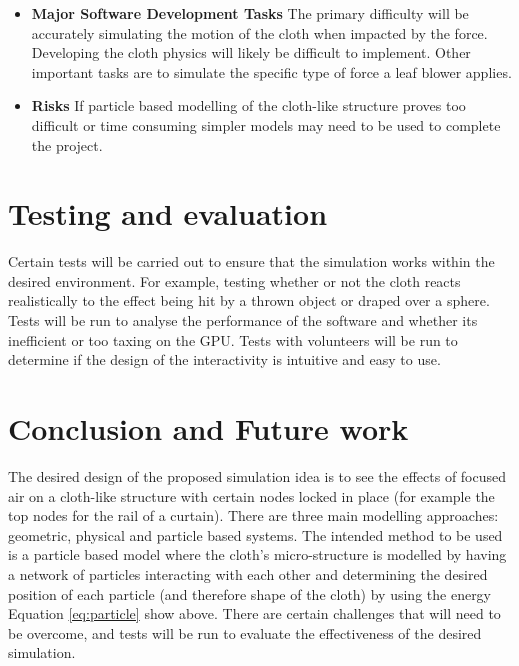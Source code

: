 \documentclass[conference,backref=page]{acmsiggraph}
\begin{document}
	\begin{itemize}
		\item  {\bf Major Software Development Tasks} The primary difficulty will be accurately simulating the motion of the cloth when impacted by the force. Developing the cloth physics will likely be difficult to implement. Other important tasks are to simulate the specific type of force a leaf blower applies.
		\item {\bf Risks} If particle based modelling of the cloth-like structure proves too difficult or time consuming simpler models may need to be used to complete the project.
	\end{itemize}
	
	\section{Testing and evaluation}
	Certain tests will be carried out to ensure that the simulation works within the desired environment. For example, testing whether or not the cloth reacts realistically to the effect being hit by a thrown object or draped over a sphere. Tests will be run to analyse the performance of the software and whether its inefficient or too taxing on the GPU. Tests with volunteers will be run to determine if the design of the interactivity is intuitive and easy to use.
	
	
	\section{Conclusion and Future work}
	The desired design of the proposed simulation idea is to see the effects of focused air on a cloth-like structure with certain nodes locked in place (for example the top nodes for the rail of a curtain). There are three main modelling approaches: geometric, physical and particle based systems. The intended method to be used is a particle based model where the cloth's micro-structure is modelled by having a network of particles interacting with each other and determining the desired position of each particle (and therefore shape of the cloth) by using the energy Equation \ref{eq:particle} show above. There are certain challenges that will need to be overcome, and tests will be run to evaluate the effectiveness of the desired simulation.
	
	
	
	
	
	
	
\end{document}

